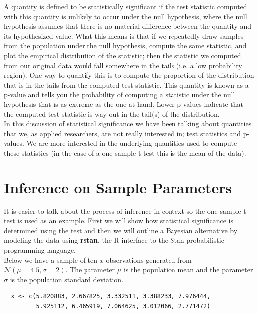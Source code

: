 \documentclass[12pt]{article}
\begin{document}
\noindent A quantity is defined to be statistically significant if the test statistic computed with this quantity is unlikely to occur under the null hypothesis, where the null hypothesis assumes that there is no material difference between the quantity and its hypothesized value. What this means is that if we repeatedly draw samples from the population under the null hypothesis, compute the same statistic, and plot the empirical distribution of the statistic; then the statistic we computed from our original data would fall somewhere in the tails (i.e. a low probability region). One way to quantify this is to compute the proportion of the distribution that is in the tails from the computed test statistic. This quantity is known as a p-value and tells you the probability of computing a statistic under the null hypothesis that is as extreme as the one at hand. Lower p-values indicate that the computed test statistic is way out in the tail(s) of the distribution. \\

\noindent In this discussion of statistical significance we have been talking about quantities that we, as applied researchers, are not really interested in; test statistics and p-values. We are more interested in the underlying quantities used to compute these statistics (in the case of a one sample t-test this is the mean of the data). \\

\section{Inference on Sample Parameters}

It is easier to talk about the process of inference in context so the one sample t-test is used as an example. First we will show how statistical significance is determined using the test and then we will outline a Bayesian alternative by modeling the data using \textbf{rstan}, the R interface to the Stan probabilistic programming language. \\

\noindent Below we have a sample of ten $x$ observations generated from $\mathcal{N}(\mu = 4.5, \sigma = 2)$. The parameter $\mu$ is the population mean and the parameter $\sigma$ is the population standard deviation.

\begin{verbatim}
  x <- c(5.820883, 2.667825, 3.332511, 3.388233, 7.976444,
         5.925112, 6.465919, 7.064625, 3.012066, 2.771472)
\end{verbatim}
\end{document}
